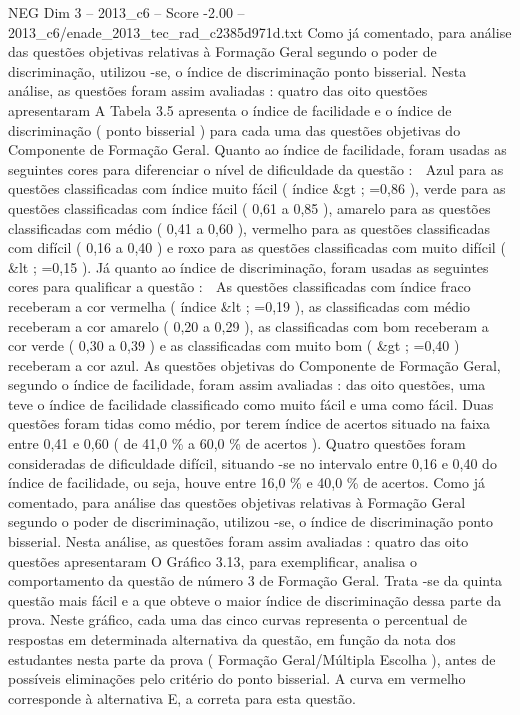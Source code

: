 \begin{textsample}{NEG Dim 3 – 2013\_c6 – Score -2.00 – 2013\_c6/enade\_2013\_tec\_rad\_c2385d971d.txt}
Como já comentado, para análise das questões objetivas relativas à Formação Geral segundo o poder de discriminação, utilizou -se, o índice de discriminação ponto bisserial.
Nesta análise, as questões foram assim avaliadas : quatro das oito questões apresentaram A Tabela 3.5 apresenta o índice de facilidade e o índice de discriminação ( ponto bisserial ) para cada uma das questões objetivas do Componente de Formação Geral.
Quanto ao índice de facilidade, foram usadas as seguintes cores para diferenciar o nível de dificuldade da questão :  Azul para as questões classificadas com índice muito fácil ( índice \&gt ; =0,86 ), verde para as questões classificadas com índice fácil ( 0,61 a 0,85 ), amarelo para as questões classificadas com médio ( 0,41 a 0,60 ), vermelho para as questões classificadas com difícil ( 0,16 a 0,40 ) e roxo para as questões classificadas com muito difícil ( \&lt ; =0,15 ).
Já quanto ao índice de discriminação, foram usadas as seguintes cores para qualificar a questão :  As questões classificadas com índice fraco receberam a cor vermelha ( índice \&lt ; =0,19 ), as classificadas com médio receberam a cor amarelo ( 0,20 a 0,29 ), as classificadas com bom receberam a cor verde ( 0,30 a 0,39 ) e as classificadas com muito bom ( \&gt ; =0,40 ) receberam a cor azul.
As questões objetivas do Componente de Formação Geral, segundo o índice de facilidade, foram assim avaliadas : das oito questões, uma teve o índice de facilidade classificado como muito fácil e uma como fácil.
Duas questões foram tidas como médio, por terem índice de acertos situado na faixa entre 0,41 e 0,60 ( de 41,0 \% a 60,0 \% de acertos ).
Quatro questões foram consideradas de dificuldade difícil, situando -se no intervalo entre 0,16 e 0,40 do índice de facilidade, ou seja, houve entre 16,0 \% e 40,0 \% de acertos.
Como já comentado, para análise das questões objetivas relativas à Formação Geral segundo o poder de discriminação, utilizou -se, o índice de discriminação ponto bisserial.
Nesta análise, as questões foram assim avaliadas : quatro das oito questões apresentaram O Gráfico 3.13, para exemplificar, analisa o comportamento da questão de número 3 de Formação Geral.
Trata -se da quinta questão mais fácil e a que obteve o maior índice de discriminação dessa parte da prova.
Neste gráfico, cada uma das cinco curvas representa o percentual de respostas em determinada alternativa da questão, em função da nota dos estudantes nesta parte da prova ( Formação Geral/Múltipla Escolha ), antes de possíveis eliminações pelo critério do ponto bisserial.
A curva em vermelho corresponde à alternativa E, a correta para esta questão.

\end{textsample}
